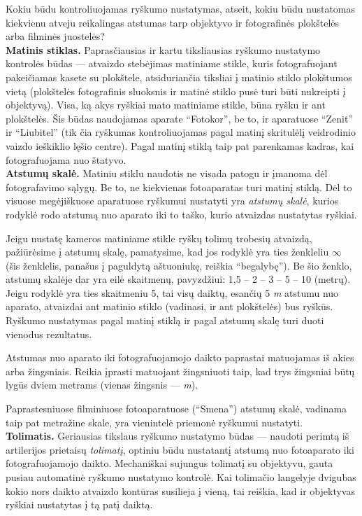 \documentclass{book}
\begin{document}
					Kokiu būdu kontroliuojamas ryškumo nustatymas, atseit, kokiu būdu nustatomas kiekvienu atveju reikalingas atstumas tarp objektyvo ir fotografinės plokštelės arba filminės juostelės?\\

					\textbf{Matinis stiklas.} Paprasčiausias ir kartu tiksliausias ryškumo nustatymo kontrolės būdas --- atvaizdo stebėjimas matiniame stikle, kuris fotografuojant pakeičiamas kasete su plokštele, atsiduriančia tiksliai į matinio stiklo plokštumos vietą (plokštelės fotografinis sluoksnis ir matinė stiklo pusė turi būti nukreipti į objektyvą). Visa, ką akys ryškiai mato matiniame stikle, būna ryšku ir ant plokštelės. Šis būdas naudojamas aparate ``Fotokor'', be to, ir aparatuose ``Zenit'' ir ``Liubitel'' (tik čia ryškumas kontroliuojamas pagal matinį skritulėlį veidrodinio vaizdo ieškiklio lęšio centre). Pagal matinį stiklą taip pat parenkamas kadras, kai fotografuojama nuo štatyvo.\\

					\textbf{Atstumų skalė.} Matiniu stiklu naudotis ne visada patogu ir įmanoma dėl fotografavimo sąlygų. Be to, ne kiekvienas fotoaparatas turi matinį stiklą. Dėl to visuose megėjiškuose aparatuose ryškumui nustatyti yra \textit{atstumų skalė}, kurios rodyklė rodo atstumą nuo aparato iki to taško, kurio atvaizdas nustatytas ryškiai.

					Jeigu nustatę kameros matiniame stikle ryškų tolimų trobesių atvaizdą, pažiūrėsime į atstumų skalę, pamatysime, kad jos rodyklė yra ties ženkleliu $\infty$ (šis ženklelis, panašus į paguldytą aštuoniukę, reiškia ``begalybę''). Be šio ženklo, atstumų skalėje dar yra eilė skaitmenų, pavyzdžiui: 1,5 -- 2 -- 3 -- 5 -- 10 (metrų). Jeigu rodyklė yra ties skaitmeniu 5, tai visų daiktų, esančių 5 \textit{m} atstumu nuo aparato, atvaizdai ant matinio stiklo (vadinasi, ir ant plokštelės) bus ryškūs. Ryškumo nustatymas pagal matinį stiklą ir pagal atstumų skalę turi duoti vienodus rezultatus.

					Atstumas nuo aparato iki fotografuojamojo daikto paprastai matuojamas iš akies arba žingsniais. Reikia įprasti matuojant žingsniuoti taip, kad trys žingsniai būtų lygūs dviem metrams (vienas žingsnis ---  \textit{m}).

					Paprastesniuose filminiuose fotoaparatuose (``Smena'') atstumų skalė, vadinama taip pat metražine skale, yra vienintelė priemonė ryškumui nustatyti.\\

					\textbf{Tolimatis.} Geriausias tikslaus ryškumo nustatymo būdas --- naudoti perimtą iš artilerijos prietaisų \textit{tolimatį}, optiniu būdu nustatantį atstumą nuo fotoaparato iki fotografuojamojo daikto. Mechaniškai sujungus tolimatį su objektyvu, gauta pusiau automatinė ryškumo nustatymo kontrolė. Kai tolimačio langelyje dvigubas kokio nors daikto atvaizdo kontūras susilieja į vieną, tai reiškia, kad ir objektyvas ryškiai nustatytas į tą patį daiktą.
\end{document}
